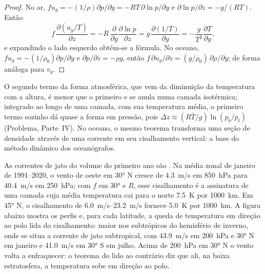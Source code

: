 \begin{proof}
No ar, $fu_g = -(1/\rho)\partial p/\partial y = -RT\,\partial\ln
p/\partial y$ e $\partial\ln p/\partial z = -g/(RT)$. Então
\[
f\,\frac{\partial(u_g/T)}{\partial z} = -R\,\frac{\partial}{\partial y}\frac{\partial\ln p}{\partial z}
= g\,\frac{\partial(1/T)}{\partial y} = -\frac{g}{T^2}\frac{\partial T}{\partial y} ,
\]
e expandindo o lado esquerdo obtém-se a fórmula. No oceano, $fu_g = -(1/\rho_0)\partial
p/\partial y$ e $\partial p/\partial z = -\rho g$, então $f\,\partial u_g/
\partial z = (g/\rho_0)\,\partial\rho/\partial y$; de forma análoga para $v_g$.
\end{proof}

O segundo termo da forma atmosférica, que vem da diminuição da temperatura
com a altura, é menor que o primeiro e se anula numa camada isotérmica;
integrado ao longo de uma camada, com sua temperatura média, o primeiro termo
sozinho dá quase a forma em pressão, pois $\Delta z \approx (R\bar T/g)
\ln(p_b/p_t)$ (Problema, Parte~IV). No oceano, o mesmo teorema transforma uma
seção de densidade através de uma corrente em seu cisalhamento vertical: a base do
método dinâmico dos oceanógrafos.


As correntes de jato do volume do primeiro ano são . Na média
zonal de janeiro de 1991--2020, o vento de oeste em \ang{30} N cresce de
\qty{4.3}{m/s} em \qty{850}{hPa} para \qty{40.4}{m/s} em \qty{250}{hPa}; com
$f$ em \ang{30} e $R$, esse cisalhamento é a assinatura de uma camada cuja média
temperatura cai para o norte \qty{7.5}{K} por \qty{1000}{km}. Em \ang{45}
N, o cisalhamento de \qtyrange{6.0}{23.2}{m/s} fornece \qty{5.0}{K} por
\qty{1000}{km}. A figura abaixo mostra os perfis e, para cada latitude,
a queda de temperatura em direção ao polo lida do cisalhamento: maior nos
subtrópicos do hemisfério de inverno, onde se situa a corrente de jato subtropical,
com \qty{43.9}{m/s} em \qty{200}{hPa} e \ang{30} N em janeiro e
\qty{41.0}{m/s} em \ang{30} S em julho. Acima de \qty{200}{hPa} em \ang{30} N
o vento volta a enfraquecer: o teorema do  lido ao contrário diz que
ali, na baixa estratosfera, a temperatura sobe em direção ao polo.

